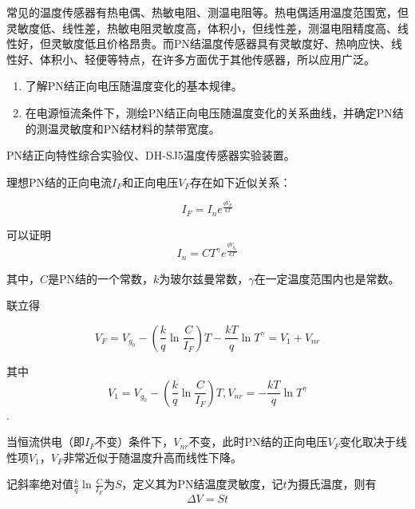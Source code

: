 \documentclass[UTF-8, a4paper, 12pt]{ctexart}
\begin{document}
    \begin{center}
        

    \end{center}
    \songti
    常见的温度传感器有热电偶、热敏电阻、测温电阻等。热电偶适用温度范围宽，但灵敏度低、线性差，热敏电阻灵敏度高，体积小，但线性差，测温电阻精度高、线性好，但灵敏度低且价格昂贵。而PN结温度传感器具有灵敏度好、热响应快、线性好、体积小、轻便等特点，在许多方面优于其他传感器，所以应用广泛。

    \textbf{ }

    \songti

    \begin{enumerate}[（1）]
        \item 了解PN结正向电压随温度变化的基本规律。
        \item 在电源恒流条件下，测绘PN结正向电压随温度变化的关系曲线，并确定PN结的测温灵敏度和PN结材料的禁带宽度。
    \end{enumerate}

    \textbf{ }

    \songti

    PN结正向特性综合实验仪、DH-SJ5温度传感器实验装置。

    \textbf{ }

    \songti

    理想PN结的正向电流$I_F$和正向电压$V_F$存在如下近似关系：

    $$I_F = I_n e^{\frac{q V_F}{kT}}$$

    可以证明$$I_n = CT^\gamma e^{\frac{qV_{g_0}}{kT}}$$

    其中，$C$是PN结的一个常数，$k$为玻尔兹曼常数，$\gamma$在一定温度范围内也是常数。

    联立得

    $$V_F = V_{g_0} - (\frac k q \ln \frac{C}{I_F})T - \frac{kT}{q}\ln T^\gamma = V_1 + V_{nr}$$

    其中$$V_1 = V_{g_0} - (\frac k q \ln \frac{C}{I_F})T, V_{nr} = - \frac{kT}{q}\ln T^\gamma$$.

    当恒流供电（即$I_F$不变）条件下，$V_{nr}$不变，此时PN结的正向电压$V_F$变化取决于线性项$V_1$，$V_F$非常近似于随温度升高而线性下降。

    记斜率绝对值$\frac k q \ln \frac{C}{I_F}$为$S$，定义其为PN结温度灵敏度，记$t$为摄氏温度，则有$$\Delta V = S t$$
\end{document}
